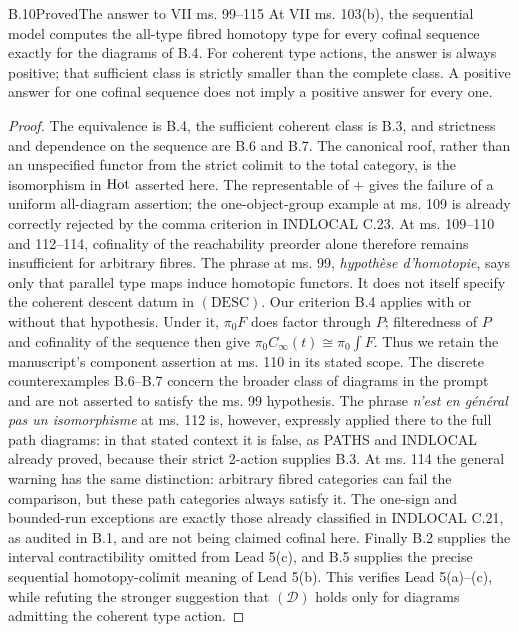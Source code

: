 \begin{claim}{B.10}{Proved}{The answer to VII ms. 99--115}
\label{B:manuscript}
At VII ms. 103(b), the sequential model computes the all-type
fibred homotopy type for every cofinal sequence exactly for the
diagrams of B.4. For coherent type actions, the answer is always
positive; that sufficient class is strictly smaller than the
complete class. A positive answer for one cofinal sequence does
not imply a positive answer for every one.
\end{claim}
\begin{proof}
The equivalence is B.4, the sufficient coherent class is B.3,
and strictness and dependence on the sequence are B.6 and B.7.
The canonical roof, rather than an unspecified functor from the
strict colimit to the total category, is the isomorphism in
$\operatorname{Hot}$ asserted here. The representable of $+$ gives the
failure of a uniform all-diagram assertion; the one-object-group
example at ms. 109 is already correctly rejected by the comma
criterion in INDLOCAL C.23. At ms. 109--110 and 112--114,
cofinality of the reachability preorder alone therefore remains
insufficient for arbitrary fibres. The phrase
at ms. 99, \emph{hypoth\`ese d'homotopie}, says only that
parallel type maps induce homotopic functors. It does not itself
specify the coherent descent datum in $(\mathrm{DESC})$.
Our criterion B.4 applies with or without that hypothesis.
Under it, $\pi_0F$ does factor through $P$; filteredness of $P$
and cofinality of the sequence then give
$\pi_0 C_\infty(t)\cong\pi_0\int F$. Thus we retain the
manuscript's component assertion at ms. 110 in its stated scope.
The discrete counterexamples B.6--B.7 concern the broader class
of diagrams in the prompt and are not asserted to satisfy the
ms. 99 hypothesis. The phrase
\emph{n'est en g\'en\'eral pas un isomorphisme} at ms. 112 is,
however, expressly applied there to the full path diagrams:
in that stated context it is false, as PATHS and INDLOCAL already
proved, because their strict 2-action supplies B.3. At ms. 114
the general warning has the same distinction: arbitrary
fibred categories can fail the comparison, but these path
categories always satisfy it. The one-sign and bounded-run
exceptions are exactly those already classified in INDLOCAL
C.21, as audited in B.1, and are not being claimed cofinal here.
Finally B.2 supplies the interval contractibility omitted from
Lead 5(c), and B.5 supplies the precise sequential homotopy-colimit
meaning of Lead 5(b). This verifies Lead 5(a)--(c), while
refuting the stronger suggestion that $(\mathcal D)$ holds
only for diagrams admitting the coherent type action.
\end{proof}
